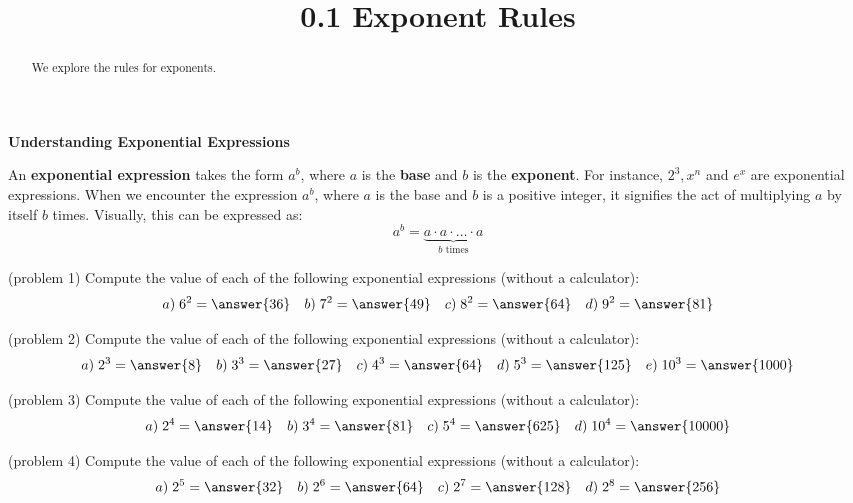 \documentclass[handout]{ximera}
\title{0.1 Exponent Rules}
\begin{document}
\begin{abstract}
We explore the rules for exponents.
\end{abstract}



\maketitle

\begin{center}
\textbf{Understanding Exponential Expressions}
\end{center}

An \textbf{exponential expression} takes the form $a^b$, where $a$ is the \textbf{base}  and 
$b$ is the \textbf{exponent}.
For instance, $2^3, x^n$ and $e^x$ are exponential expressions. When we encounter the expression $a^b$, 
where $a$ is the base and $b$ is a positive integer, it signifies the act of multiplying $a$
by itself $b$ times. Visually, this can be expressed as:
\[
a^b = \underbrace{a \cdot a \cdot \ldots \cdot a}_\text{$b$ times} 
\]


\begin{problem}(problem 1)
Compute the value of each of the following exponential expressions (without a calculator):
\[
a) \;6^2 = \answer{36} \quad b) \;7^2 = \answer{49} \quad c) \;8^2 = \answer{64} \quad d) \;9^2 = \answer{81}
\]
\end{problem}

\begin{problem}(problem 2)
Compute the value of each of the following exponential expressions (without a calculator):
\[
a) \;2^3 = \answer{8} \quad b) \;3^3 = \answer{27} \quad c) \;4^3 = \answer{64} \quad d) \;5^3 = \answer{125} 
\quad e) \;10^3 = \answer{1000}
\]
\end{problem}

\begin{problem}(problem 3)
Compute the value of each of the following exponential expressions (without a calculator):
\[
a) \;2^4 = \answer{14} \quad b) \;3^4 = \answer{81} \quad c) \;5^4 = \answer{625} \quad d) \;10^4 = \answer{10000}
\]
\end{problem}

\begin{problem}(problem 4)
Compute the value of each of the following exponential expressions (without a calculator):
\[
a) \;2^5 = \answer{32} \quad b) \;2^6 = \answer{64} \quad c) \;2^7 = \answer{128} \quad d) \;2^8 = \answer{256}
\]
\end{problem}
\end{document}
